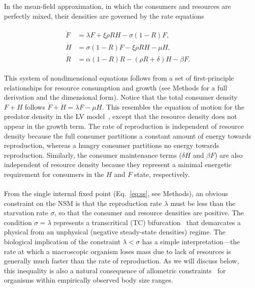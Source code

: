 \documentclass[twocolumn,preprintnumbers,amsmath,amssymb,superscriptaddress]{revtex4}
\begin{document}
In the mean-field approximation, in which the consumers and resources are
perfectly mixed, their densities are governed by the rate equations

\begin{align}
\label{eq:system}
\begin{split}
\dot{F} &= \lambda F + \xi \rho RH - \sigma \left(1-R\right)F,  \\
\dot{H} &= \sigma \left(1-R\right)F - \xi \rho RH - \mu H,  \\
\dot{R} &= \alpha \left(1-R\right)R -\left(\rho R+\delta\right)H-\beta F.
\end{split}
\end{align}

This system of nondimensional equations follows from a set of first-principle
relationships for resource consumption and growth (see Methods for a full derivation and the dimensional form).
Notice that the total consumer density $F+H$ follows $\dot{F}+\dot{H}=\lambda F-\mu H$.
This resembles the equation of motion for the predator density in the LV model~\citep{murray2011mathematical}, except that the resource density does not appear in the growth term.
The rate of reproduction is independent of resource density because the full
consumer partitions a constant amount of energy towards reproduction, whereas
a hungry consumer partitions no energy towards reproduction.  Similarly, the
consumer maintenance terms ($\delta H$ and $\beta F$) are also independent of
resource density because they represent a minimal energetic requirement for
consumers in the $H$ and $F$ state, respectively.\\



\\ 
From the single
internal fixed point (Eq.~\eqref{eq:ss}, see Methods), an obvious constraint
on the NSM is that the reproduction rate $\lambda$ must be less than the
starvation rate $\sigma$, so that the consumer and resource densities are
positive.
The condition $\sigma = \lambda$ represents a transcritical (TC)
bifurcation~\citep{Strogatz:2008wo} that demarcates a physical from an
unphysical (negative steady-state densities) regime.  The biological
implication of the constraint $\lambda<\sigma$ has a simple
interpretation---the rate at which a macroscopic organism loses mass due to
lack of resources is generally much faster than the rate of reproduction.  As
we will discuss below, this inequality is also a natural consequence of
allometric constraints~\citep{Kempes:2012hy} for organisms within empirically
observed body size ranges. %
\end{document}
